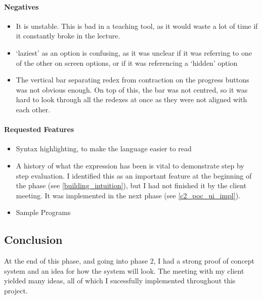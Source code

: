 \paragraph{Negatives}
\begin{itemize}
    \item It is unstable. This is bad in a teaching tool, as it would waste a lot of time if it constantly broke in the lecture. 
    \item `laziest' as an option is confusing, as it was unclear if it was referring to one of the other on screen options, or if it was referencing a `hidden' option
    \item The vertical bar separating redex from contraction on the progress buttons was not obvious enough. On top of this, the bar was not centred, so it was hard to look through all the redexes at once as they were not aligned with each other. 
\end{itemize}

\paragraph{Requested Features}
\begin{itemize}
    \item Syntax highlighting, to make the language easier to read   
    \item A history of what the expression has been is vital to demonstrate step by step evaluation. I identified this as an important feature at the beginning of the phase (see \ref{building_intuition}), but I had not finished it by the client meeting. It was implemented in the next phase (see \ref{c2_poc_ui_impl}). 
    \item Sample Programs
\end{itemize}

\subsection{Conclusion}
At the end of this phase, and going into phase 2, I had a strong proof of concept system and an idea for how the system will look. The meeting with my client yielded many ideas, all of which I sucessfully implemented throughout this project. 